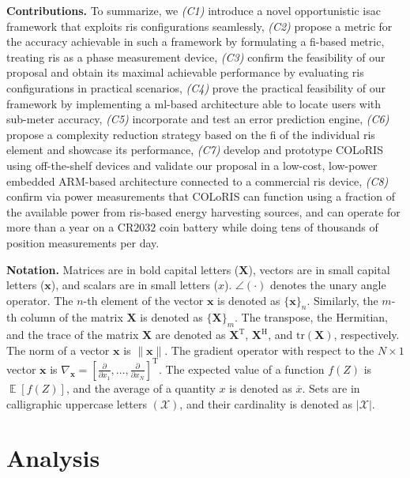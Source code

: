 \documentclass[10pt,journal,compsoc]{IEEEtran}
\newcommand{\ssub}[1]{{\scriptscriptstyle { #1}}}
\newcommand{\name}{COLoRIS}
\newcommand{\mb}[1]{\mathbf{{#1}}}
\newcommand{\tran}{\mathrm{T}}
\newcommand{\herm}{\mathrm{H}}
\newcommand{\tr}{\mathrm{tr}}
\begin{document}
{\bf Contributions.} To summarize, we \emph{(C1)} introduce a novel opportunistic \gls{isac} framework that exploits \gls{ris} configurations seamlessly, \emph{(C2)} propose a metric for the accuracy achievable in such a framework by formulating a \gls{fi}-based metric, treating \gls{ris} as a phase measurement device, \emph{(C3)} confirm the feasibility of our proposal and obtain its maximal achievable performance by evaluating \gls{ris} configurations in practical scenarios, \emph{(C4)} prove the practical feasibility of our framework by implementing a \gls{ml}-based architecture able to locate users with sub-meter accuracy, \emph{(C5)} incorporate and test an error prediction engine, \emph{(C6)} propose a complexity reduction strategy based on the \gls{fi} of the individual \gls{ris} element and showcase its performance,
\emph{(C7)} develop and prototype \name{} using off-the-shelf devices and validate our proposal in a low-cost, low-power embedded ARM-based architecture connected to a commercial \gls{ris} device, 
\emph{(C8)} confirm via power measurements that \name{} can function using a fraction of the available power from \gls{ris}-based energy harvesting sources, and can operate for more than a year on a CR$2032$ coin battery while doing tens of thousands of position measurements per day.

{\bf Notation.} Matrices are in bold capital letters ($\mb{X}$), vectors are in small capital letters ($\mb{x}$), and scalars are in small letters ($x$). $\angle (\cdot)$ denotes the unary angle operator. The $n$-th element of the vector $\mb{x}$ is denoted as $\{\mb{x}\}_{n}$. Similarly, the $m$-th column of the matrix $\mb{X}$ is denoted as $\{\mb{X}\}_{m}$. The transpose, the Hermitian, and the trace of the matrix $\mb{X}$ are denoted as $\mb{X}^\tran$, $\mb{X}^\herm$, and $\tr(\mb{X})$, respectively. The norm of a vector $\mb{x}$ is $\|\mb{x}\|$. The gradient operator with respect to the $N\times1$ vector $\mb{x}$ is $\nabla_{\mb{x}}= [\frac{\partial}{\partial x_1}, \dots, \frac{\partial}{\partial x_{\ssub{N}}}]^\tran$. The expected value of a function $f(Z)$ is $\operatorname{\mathbb{E}}\left[f(Z)\right]$, and the average of a quantity $x$ is denoted as $ \overline{x}$. Sets are in calligraphic uppercase letters $(\mathcal{X})$, and their cardinality is denoted as $|\mathcal{X}|$.



\section{Analysis}
\label{sec:system_model}
\end{document}
